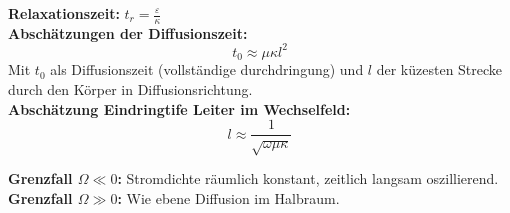 \documentclass[german]{latex4ei/latex4ei_sheet}
\begin{document}
\begin{sectionbox}
    \textbf{Relaxationszeit:} $t_r = \frac{\varepsilon}{\kappa}$ \vspace{1mm}\\
    \textbf{Abschätzungen der Diffusionszeit:}
    \begin{equation*}
        t_0 \approx \mu \kappa l^2
    \end{equation*}
    Mit $t_0$ als Diffusionszeit (vollständige durchdringung) und $l$ der küzesten Strecke durch den Körper in Diffusionsrichtung. \vspace{2mm}\\
    \textbf{Abschätzung Eindringtife Leiter im Wechselfeld:}
    \begin{equation*}
        l \approx \frac{1}{\sqrt{\omega \mu \kappa}} 
    \end{equation*}

    \textbf{Grenzfall $\Omega \ll 0$:} Stromdichte räumlich konstant, zeitlich langsam oszillierend.\\
    \textbf{Grenzfall $\Omega \gg 0$:} Wie ebene Diffusion im Halbraum.\\
\end{sectionbox}
\end{document}
